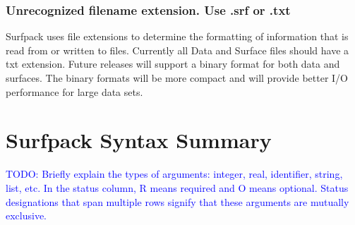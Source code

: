 \documentclass{article}
\begin{document}
\subsubsection{ Unrecognized filename extension.  Use .srf or .txt}
Surfpack uses file extensions to determine the formatting of information that is
read from or written to files.  Currently all Data and Surface files should have
a txt extension.  Future releases will support a binary format for both data and
surfaces.  The binary formats will be more compact and will provide better I/O
performance for large data sets.

\appendix

\section{Surfpack Syntax Summary}
\textcolor{blue}{TODO: Briefly explain the types of arguments: integer, real, identifier, string, list, etc.  In the status column, R means required and O means optional.  Status designations that span multiple rows signify that these arguments are mutually exclusive.}
\end{document}
